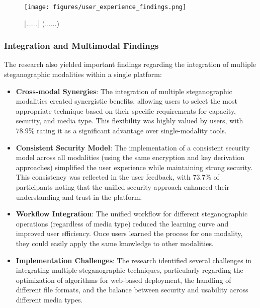 \documentclass[12pt, a4paper, oneside]{book}
\begin{document}
\begin{figure}[htbp]
    \centering
    \texttt{[image: figures/user\_experience\_findings.png]}
    \caption{[......] (......)}
    \label{fig:user_experience}
\end{figure}

\subsubsection{Integration and Multimodal Findings}

The research also yielded important findings regarding the integration of multiple steganographic modalities within a single platform:

\begin{itemize}[leftmargin=*]
    \item \textbf{Cross-modal Synergies}: The integration of multiple steganographic modalities created synergistic benefits, allowing users to select the most appropriate technique based on their specific requirements for capacity, security, and media type. This flexibility was highly valued by users, with 78.9\% rating it as a significant advantage over single-modality tools.

    \item \textbf{Consistent Security Model}: The implementation of a consistent security model across all modalities (using the same encryption and key derivation approaches) simplified the user experience while maintaining strong security. This consistency was reflected in the user feedback, with 73.7\% of participants noting that the unified security approach enhanced their understanding and trust in the platform.

    \item \textbf{Workflow Integration}: The unified workflow for different steganographic operations (regardless of media type) reduced the learning curve and improved user efficiency. Once users learned the process for one modality, they could easily apply the same knowledge to other modalities.

    \item \textbf{Implementation Challenges}: The research identified several challenges in integrating multiple steganographic techniques, particularly regarding the optimization of algorithms for web-based deployment, the handling of different file formats, and the balance between security and usability across different media types.
\end{itemize}
\end{document}
